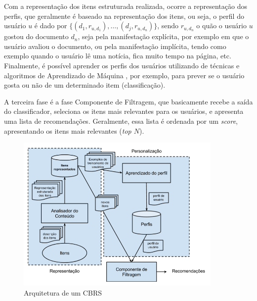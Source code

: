 \documentclass[
    12pt,                %
    oneside,            %
    a4paper,            %
    english,            %
    brazil                %
    ]{abntex2ppgsi}
\begin{document}


Com a representação dos itens estruturada realizada, ocorre a representação dos perfis, que geralmente é baseado na representação dos itens, ou seja, o perfil do usuário $u$ é dado por $\{ (d_1, r_{u,d_1}), \dots, (d_j, r_{u,d_n}) \}$, sendo $r_{u,d_n}$ o quão o usuário $u$ gostou do documento $d_n$, seja pela manifestação explícita, por exemplo em que o usuário avaliou o documento, ou pela manifestação implícita, tendo como exemplo quando o usuário lê uma notícia, fica muito tempo na página, etc.
Finalmente, é possível aprender os perfis dos usuários utilizando de técnicas e algoritmos de Aprendizado de Máquina \cite{Adomavicius2005,Lops2011,Jannach2011}, por exemplo, para prever se o usuário gosta ou não de um determinado item (classificação).

A terceira fase é a fase Componente de Filtragem, que basicamente recebe a saída do classificador, seleciona os itens mais relevantes para os usuários, e apresenta uma lista de recomendações. Geralmente, essa lista é ordenada por um \textit{score}, apresentando os itens mais relevantes (\textit{top $N$}).

\begin{figure}[h]
\centering
\includegraphics[width=100mm]{img/approach.png}
\caption{Arquitetura de um CBRS}
\label{fig:approach}
\end{figure}
\end{document}
